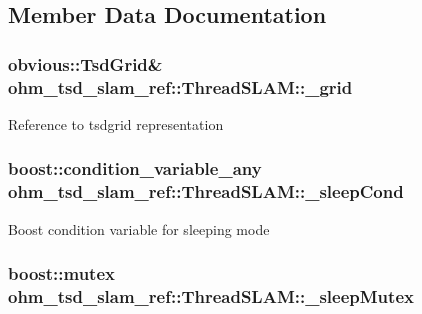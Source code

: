 \subsection{Member Data Documentation}
\hypertarget{classohm__tsd__slam__ref_1_1ThreadSLAM_ab0eaf26f3b9c549fe0d21332f88ccc35}{
\subsubsection[{\-\_\-grid}]{\setlength{\rightskip}{0pt plus 5cm}obvious\-::\-Tsd\-Grid\& ohm\-\_\-tsd\-\_\-slam\-\_\-ref\-::\-Thread\-S\-L\-A\-M\-::\-\_\-grid\hspace{0.3cm}{\ttfamily [protected]}}}\label{classohm__tsd__slam__ref_1_1ThreadSLAM_ab0eaf26f3b9c549fe0d21332f88ccc35}
Reference to tsdgrid representation \hypertarget{classohm__tsd__slam__ref_1_1ThreadSLAM_a0302ee2027cf077f552395da5c618c30}{
\subsubsection[{\-\_\-sleep\-Cond}]{\setlength{\rightskip}{0pt plus 5cm}boost\-::condition\-\_\-variable\-\_\-any ohm\-\_\-tsd\-\_\-slam\-\_\-ref\-::\-Thread\-S\-L\-A\-M\-::\-\_\-sleep\-Cond\hspace{0.3cm}{\ttfamily [protected]}}}\label{classohm__tsd__slam__ref_1_1ThreadSLAM_a0302ee2027cf077f552395da5c618c30}
Boost condition variable for sleeping mode \hypertarget{classohm__tsd__slam__ref_1_1ThreadSLAM_aa461c69e9be71020e371babc6e534120}{
\subsubsection[{\-\_\-sleep\-Mutex}]{\setlength{\rightskip}{0pt plus 5cm}boost\-::mutex ohm\-\_\-tsd\-\_\-slam\-\_\-ref\-::\-Thread\-S\-L\-A\-M\-::\-\_\-sleep\-Mutex\hspace{0.3cm}{\ttfamily [protected]}}}\label{classohm__tsd__slam__ref_1_1ThreadSLAM_aa461c69e9be71020e371babc6e534120}

